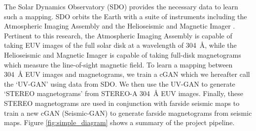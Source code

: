 \documentclass[11pt,a4paper,onecolumn]{report}
\begin{document}
The Solar Dynamics Observatory (SDO) \citep{pesnell_solar_2012} provides the
necessary data to learn such a mapping. SDO orbits the Earth with a suite of
instruments including the Atmospheric Imaging Assembly
\citep{lemen_atmospheric_2012} and the Helioseismic and Magnetic Imager
\citep{scherrer_helioseismic_2012}. Pertinent to this research, the Atmospheric
Imaging Assembly is capable of taking EUV images of the full solar disk at a
wavelength of \SI{304}{\angstrom}, while the Helioseismic and Magnetic Imager is
capable of taking full-disk magnetograms which measure the line-of-sight
magnetic field. To learn a mapping between \SI{304}{\angstrom} EUV images and
magnetograms, we train a cGAN which we hereafter call the `UV-GAN' using data
from SDO. We then use the UV-GAN to generate `STEREO magnetograms' from STEREO-A
\SI{304}{\angstrom} EUV images. Finally, these STEREO magnetograms are used in
conjunction with farside seismic maps to train a new cGAN (Seismic-GAN) to
generate farside magnetograms from seismic maps. Figure \ref{fig:simple_diagram}
shows a summary of the project pipeline. \\
\end{document}
